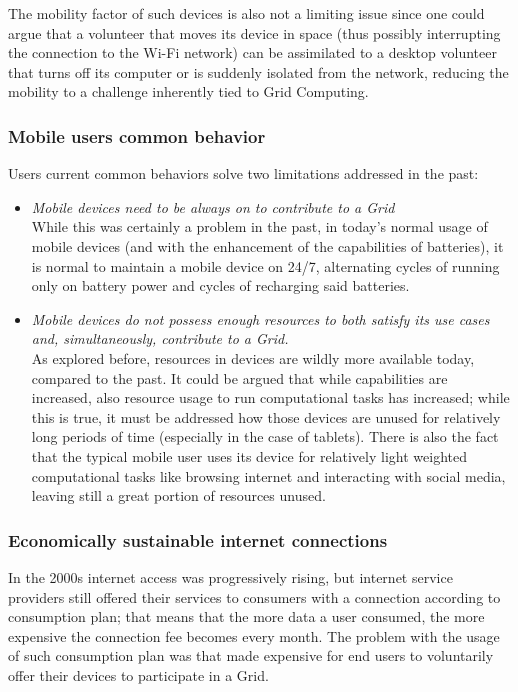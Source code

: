 The mobility factor of such devices is also not a limiting issue since one could argue that a volunteer that moves its device in space (thus possibly interrupting the connection to the Wi-Fi network) can be assimilated to a desktop volunteer that turns off its computer or is suddenly isolated from the network, reducing the mobility to a challenge inherently tied to Grid Computing.

\subsubsection{Mobile users common behavior}
Users current common behaviors solve two limitations addressed in the past:
\begin{itemize}
    \item \textit{Mobile devices need to be always on to contribute to a Grid}\\
    While this was certainly a problem in the past, in today's normal usage of mobile devices (and with the enhancement of the capabilities of batteries), it is normal to maintain a mobile device on 24/7, alternating cycles of running only on battery power and cycles of recharging said batteries.
    \item \textit{Mobile devices do not possess enough resources to both satisfy its use cases and, simultaneously, contribute to a Grid.}\\
    As explored before, resources in devices are wildly more available today, compared to the past. It could be argued that while capabilities are increased, also resource usage to run computational tasks has increased; while this is true, it must be addressed how those devices are unused for relatively long periods of time (especially in the case of tablets). There is also the fact that the typical mobile user uses its device for relatively light weighted computational tasks like browsing internet and interacting with social media, leaving still a great portion of resources unused.
\end{itemize}

\subsubsection{Economically sustainable internet connections}
In the 2000s internet access was progressively rising, but internet service providers still offered their services to consumers with a connection according to consumption plan; that means that the more data a user consumed, the more expensive the connection fee becomes every month. The problem with the usage of such consumption plan was that made expensive for end users to voluntarily offer their devices to participate in a Grid.

